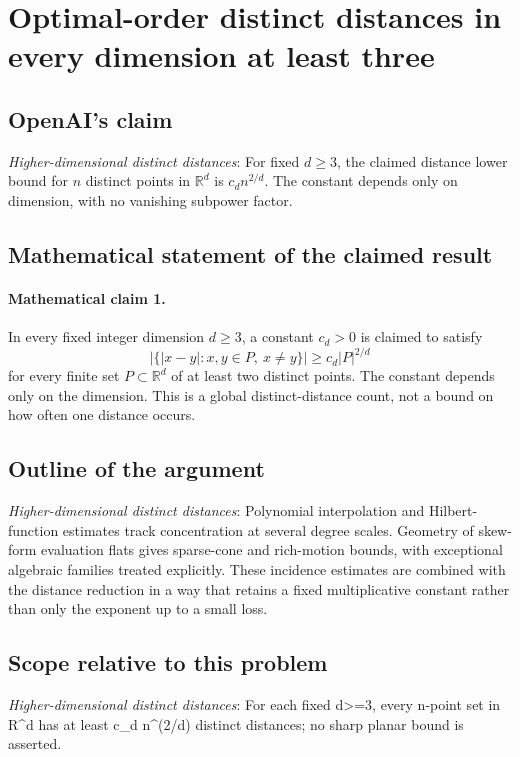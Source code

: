 \documentclass[11pt]{article}
\begin{document}
\section*{Optimal-order distinct distances in every dimension at least three}

\subsection{OpenAI's claim}
\textit{Higher-dimensional distinct distances}: For fixed $d\ge3$, the claimed distance lower bound for $n$ distinct points in $\mathbb R^d$ is $c_d n^{2/d}$. The constant depends only on dimension, with no vanishing subpower factor.

\subsection{Mathematical statement of the claimed result}
\paragraph{Mathematical claim 1.} In every fixed integer dimension $d\ge3$, a constant $c_d>0$ is claimed to satisfy \[\bigl|\{|x-y|:x,y\in P,\ x\ne y\}\bigr|\ge c_d|P|^{2/d}\] for every finite set $P\subset\mathbb R^d$ of at least two distinct points. The constant depends only on the dimension. This is a global distinct-distance count, not a bound on how often one distance occurs.

\subsection{Outline of the argument}
\textit{Higher-dimensional distinct distances}: Polynomial interpolation and Hilbert-function estimates track concentration at several degree scales. Geometry of skew-form evaluation flats gives sparse-cone and rich-motion bounds, with exceptional algebraic families treated explicitly. These incidence estimates are combined with the distance reduction in a way that retains a fixed multiplicative constant rather than only the exponent up to a small loss.

\subsection{Scope relative to this problem}
\textit{Higher-dimensional distinct distances}: For each fixed d>=3, every n-point set in R\textasciicircum{}d has at least c\_d n\textasciicircum{}(2/d) distinct distances; no sharp planar bound is asserted.
\end{document}
